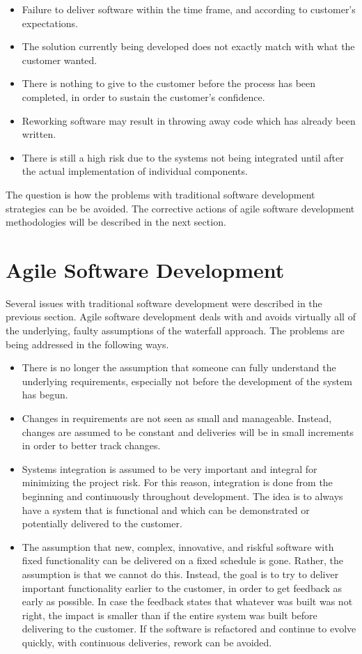\documentclass[a4paper,english,12pt]{report}
\begin{document}
\begin{itemize}
  \item Failure to deliver software within the time frame, and according to customer's expectations.
  \item The solution currently being developed does not exactly match with what the customer wanted.
  \item There is nothing to give to the customer before the process has been completed, in order to sustain the customer's confidence.
  \item Reworking software may result in throwing away code which has already been written.
  \item There is still a high risk due to the systems not being integrated until after the actual implementation of individual components.
\end{itemize}

The question is how the problems with traditional software development strategies can be be avoided. The corrective actions of agile software development methodologies will be described in the next section.

\section{Agile Software Development}\label{sec:agile-software-development}
Several issues with traditional software development were described in the previous section. Agile software development deals with and avoids virtually all of the underlying, faulty assumptions of the waterfall approach. The problems are being addressed in the following ways. \citep{leffingwell2007scaling}

\begin{itemize}
  \item There is no longer the assumption that someone can fully understand the underlying requirements, especially not before the development of the system has begun.
  \item Changes in requirements are not seen as small and manageable. Instead, changes are assumed to be constant and deliveries will be in small increments in order to better track changes.
  \item Systems integration is assumed to be very important and integral for minimizing the project risk. For this reason, integration is done from the beginning and continuously throughout development. The idea is to always have a system that is functional and which can be demonstrated or potentially delivered to the customer.
  \item The assumption that new, complex, innovative, and riskful software with fixed functionality can be delivered on a fixed schedule is gone. Rather, the assumption is that we cannot do this. Instead, the goal is to try to deliver important functionality earlier to the customer, in order to get feedback as early as possible. In case the feedback states that whatever was built was not right, the impact is smaller than if the entire system was built before delivering to the customer. If the software is refactored and continue to evolve quickly, with continuous deliveries, rework can be avoided.
\end{itemize}
\end{document}
